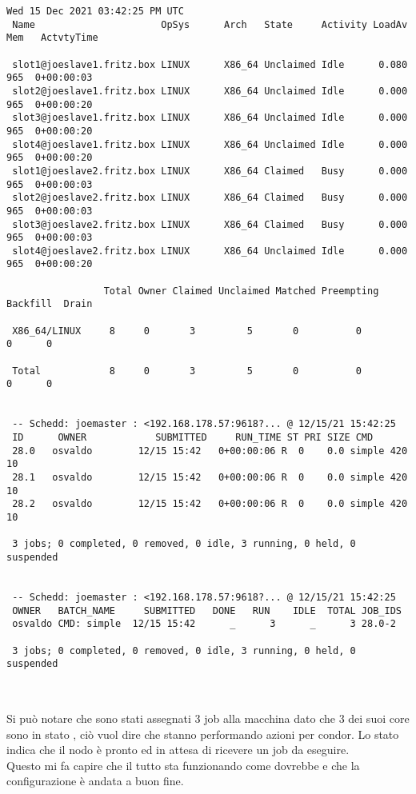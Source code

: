 \begin{lstlisting}[style=output_tiny]
 Wed 15 Dec 2021 03:42:25 PM UTC
 Name                      OpSys      Arch   State     Activity LoadAv Mem   ActvtyTime
 
 slot1@joeslave1.fritz.box LINUX      X86_64 Unclaimed Idle      0.080  965  0+00:00:03
 slot2@joeslave1.fritz.box LINUX      X86_64 Unclaimed Idle      0.000  965  0+00:00:20
 slot3@joeslave1.fritz.box LINUX      X86_64 Unclaimed Idle      0.000  965  0+00:00:20
 slot4@joeslave1.fritz.box LINUX      X86_64 Unclaimed Idle      0.000  965  0+00:00:20
 slot1@joeslave2.fritz.box LINUX      X86_64 Claimed   Busy      0.000  965  0+00:00:03
 slot2@joeslave2.fritz.box LINUX      X86_64 Claimed   Busy      0.000  965  0+00:00:03
 slot3@joeslave2.fritz.box LINUX      X86_64 Claimed   Busy      0.000  965  0+00:00:03
 slot4@joeslave2.fritz.box LINUX      X86_64 Unclaimed Idle      0.000  965  0+00:00:20
 
                 Total Owner Claimed Unclaimed Matched Preempting Backfill  Drain
 
 X86_64/LINUX     8     0       3         5       0          0        0      0
 
 Total            8     0       3         5       0          0        0      0
 
 
 -- Schedd: joemaster : <192.168.178.57:9618?... @ 12/15/21 15:42:25
 ID      OWNER            SUBMITTED     RUN_TIME ST PRI SIZE CMD
 28.0   osvaldo        12/15 15:42   0+00:00:06 R  0    0.0 simple 420 10
 28.1   osvaldo        12/15 15:42   0+00:00:06 R  0    0.0 simple 420 10
 28.2   osvaldo        12/15 15:42   0+00:00:06 R  0    0.0 simple 420 10
 
 3 jobs; 0 completed, 0 removed, 0 idle, 3 running, 0 held, 0 suspended
 
 
 -- Schedd: joemaster : <192.168.178.57:9618?... @ 12/15/21 15:42:25
 OWNER   BATCH_NAME     SUBMITTED   DONE   RUN    IDLE  TOTAL JOB_IDS
 osvaldo CMD: simple  12/15 15:42      _      3      _      3 28.0-2
 
 3 jobs; 0 completed, 0 removed, 0 idle, 3 running, 0 held, 0 suspended
 
\end{lstlisting}
\ \\
Si pu\`{o} notare che sono stati assegnati 3 job alla macchina  dato che 3 dei suoi core sono in stato , ci\`{o} vuol dire che stanno performando azioni per condor. %
Lo stato  indica che il nodo \`{e} pronto ed in attesa di ricevere un job da eseguire.\\
Questo mi fa capire che il tutto sta funzionando come dovrebbe e che la configurazione \`{e} andata a buon fine.

